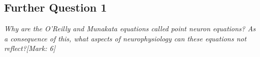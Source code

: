 \subsection{Further Question 1}
\label{Further Question 1 SubSection}

\begin{tcolorbox}[colback=gray!20!white,colframe=gray!20!white]
  \emph{Why are the O’Reilly and Munakata equations called point neuron equations? As a consequence of this, what aspects of neurophysiology can these equations not reflect?[Mark: 6]}
\end{tcolorbox} 
\vspace{0.5cm}

